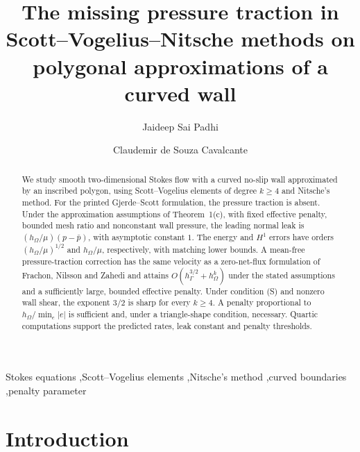 \documentclass[5p,times]{elsarticle}
\theoremstyle{definition}
\begin{document}
\begin{frontmatter}
\title{The missing pressure traction in Scott--Vogelius--Nitsche methods on polygonal approximations of a curved wall}

\author[pur]{Jaideep Sai Padhi}
\address[pur]{Department of Computer Science, Purdue University, West Lafayette, IN 47907, USA}
\author[cav]{Claudemir de Souza Cavalcante}
\address[cav]{Graduate Program in Mathematics and Statistics, Institute of Exact and Natural Sciences, Federal University of Par\'a (UFPA), Bel\'em, Brazil}

\begin{abstract}
We study smooth two-dimensional Stokes flow with a curved no-slip wall approximated by an inscribed polygon, using Scott--Vogelius elements of degree $k\ge4$ and Nitsche's method. For the printed Gjerde--Scott formulation, the pressure traction is absent. Under the approximation assumptions of Theorem~1(c), with fixed effective penalty, bounded mesh ratio and nonconstant wall pressure, the leading normal leak is $(h_\Omega/\mu)(p-\bar p)$, with asymptotic constant $1$. The energy and $H^1$ errors have orders $(h_\Omega/\mu)^{1/2}$ and $h_\Omega/\mu$, respectively, with matching lower bounds. A mean-free pressure-traction correction has the same velocity as a zero-net-flux formulation of Frachon, Nilsson and Zahedi and attains $O(h_\Gamma^{3/2}+h_\Omega^k)$ under the stated assumptions and a sufficiently large, bounded effective penalty. Under condition (S) and nonzero wall shear, the exponent $3/2$ is sharp for every $k\ge4$. A penalty proportional to $h_\Omega/\min_e|e|$ is sufficient and, under a triangle-shape condition, necessary. Quartic computations support the predicted rates, leak constant and penalty thresholds.
\end{abstract}

\begin{keyword}
Stokes equations \sep Scott--Vogelius elements \sep Nitsche's method \sep curved boundaries \sep penalty parameter
\end{keyword}
\end{frontmatter}

\section{Introduction}\label{sec:intro}
\end{document}

